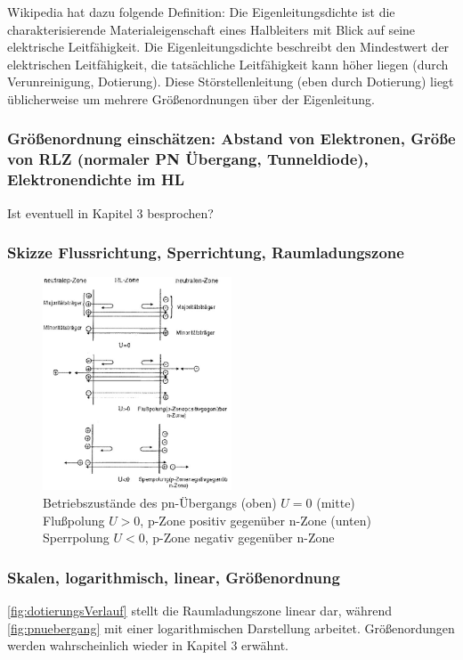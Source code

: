 \documentclass{article}
\begin{document}
	Wikipedia hat dazu folgende Definition: Die Eigenleitungsdichte ist die charakterisierende Materialeigenschaft eines Halbleiters mit Blick auf seine elektrische Leitfähigkeit.
	Die Eigenleitungsdichte beschreibt den Mindestwert der elektrischen Leitfähigkeit, die tatsächliche Leitfähigkeit kann höher liegen (durch Verunreinigung, Dotierung). Diese Störstellenleitung (eben durch Dotierung) liegt üblicherweise um mehrere Größenordnungen über der Eigenleitung. 
	
	\subsubsection{Größenordnung einschätzen: Abstand von Elektronen, Größe von RLZ (normaler PN Übergang, Tunneldiode), Elektronendichte im HL}
	Ist eventuell in Kapitel 3 besprochen?
	
	\subsubsection{Skizze Flussrichtung, Sperrichtung, Raumladungszone}
    
       \begin{figure}[H]
        \centering
        \includegraphics[width=0.5\textwidth]{fig/pn-betriebszustande}
        \caption{Betriebszustände des pn-Übergangs (oben) $U = 0$ (mitte) Flußpolung $U > 0$, p-Zone positiv gegenüber n-Zone (unten) Sperrpolung $U < 0$, p-Zone negativ gegenüber n-Zone}
        \label{fig:pn-betriebszustände}
    \end{figure}

	\subsubsection{Skalen, logarithmisch, linear, Größenordnung}
	\autoref{fig:dotierungsVerlauf} stellt die Raumladungszone linear dar, während \autoref{fig:pnuebergang} mit einer logarithmischen Darstellung arbeitet.
	Größenordungen werden wahrscheinlich wieder in Kapitel 3 erwähnt. 
	
\end{document}
